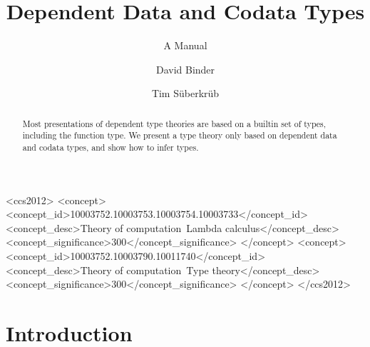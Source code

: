 \documentclass[acmsmall,review,anonymous]{acmart}
\begin{document}
\title{Dependent Data and Codata Types}
\subtitle{A Manual}



\begin{CCSXML}
  <ccs2012>
  <concept>
  <concept_id>10003752.10003753.10003754.10003733</concept_id>
  <concept_desc>Theory of computation~Lambda calculus</concept_desc>
  <concept_significance>300</concept_significance>
  </concept>
  <concept>
  <concept_id>10003752.10003790.10011740</concept_id>
  <concept_desc>Theory of computation~Type theory</concept_desc>
  <concept_significance>300</concept_significance>
  </concept>
  </ccs2012>
\end{CCSXML}


\author{David Binder}


\author{Tim Süberkrüb}


\begin{abstract}
  Most presentations of dependent type theories are based on a builtin set of types, including the function type.
  We present a type theory only based on dependent data and codata types, and show how to infer types.
\end{abstract}

\maketitle

\section{Introduction}
\label{sec:intro}

\end{document}
